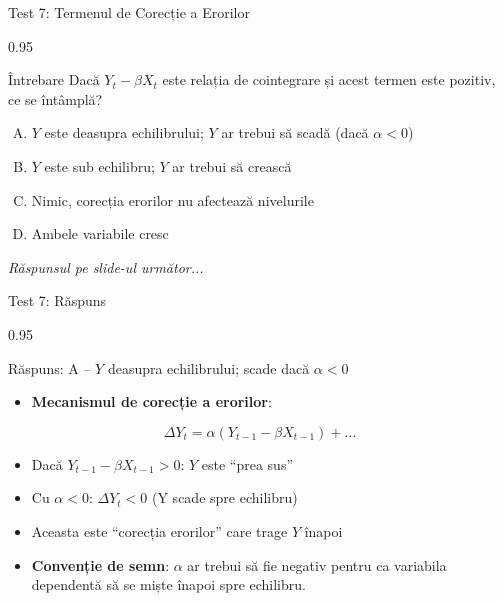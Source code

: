 \documentclass[9pt, aspectratio=169, t]{beamer}
\begin{document}
\begin{frame}{Test 7: Termenul de Corecție a Erorilor}
    \begin{cminipage}{0.95\textwidth}
    \begin{alertblock}{Întrebare}
        Dacă $Y_t - \beta X_t$ este relația de cointegrare și acest termen este pozitiv, ce se întâmplă?
    \end{alertblock}

    \vspace{0.3cm}

    \begin{enumerate}[A)]\setlength{\itemsep}{0pt}
        \item $Y$ este deasupra echilibrului; $Y$ ar trebui să scadă (dacă $\alpha < 0$)
        \item $Y$ este sub echilibru; $Y$ ar trebui să crească
        \item Nimic, corecția erorilor nu afectează nivelurile
        \item Ambele variabile cresc
    \end{enumerate}

    \vspace{0.5cm}
    \begin{flushright}\textit{Răspunsul pe slide-ul următor...}\end{flushright}
    \end{cminipage}
\end{frame}

\begin{frame}{Test 7: Răspuns}
    \begin{cminipage}{0.95\textwidth}
    \begin{exampleblock}{Răspuns: A -- $Y$ deasupra echilibrului; scade dacă $\alpha < 0$}
        \begin{itemize}\setlength{\itemsep}{0pt}
            \item \textbf{Mecanismul de corecție a erorilor}:
        \end{itemize}
        $$\Delta Y_t = \alpha(Y_{t-1} - \beta X_{t-1}) + \ldots$$

        \begin{itemize}\setlength{\itemsep}{0pt}
            \item Dacă $Y_{t-1} - \beta X_{t-1} > 0$: $Y$ este ``prea sus''
            \item Cu $\alpha < 0$: $\Delta Y_t < 0$ (Y scade spre echilibru)
            \item Aceasta este ``corecția erorilor'' care trage $Y$ înapoi
            \item \textbf{Convenție de semn}: $\alpha$ ar trebui să fie negativ pentru ca variabila dependentă să se miște înapoi spre echilibru.
        \end{itemize}
    \end{exampleblock}
    \end{cminipage}
\end{frame}
\end{document}
